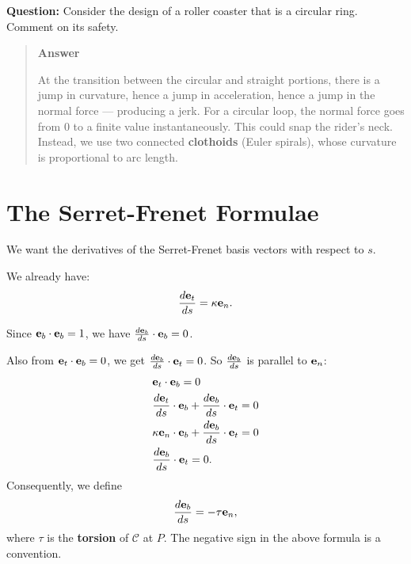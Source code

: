 \documentclass[
  letterpaper,
  DIV=11,
  numbers=noendperiod]{scrreprt}
\begin{document}
\begin{tcolorbox}[enhanced jigsaw, arc=.35mm, bottomrule=.15mm, bottomtitle=1mm, breakable, colback=white, colbacktitle=quarto-callout-tip-color!10!white, colframe=quarto-callout-tip-color-frame, coltitle=black, left=2mm, leftrule=.75mm, opacityback=0, opacitybacktitle=0.6, rightrule=.15mm, title=\textcolor{quarto-callout-tip-color}{\faLightbulb}\hspace{0.5em}{Think!}, titlerule=0mm, toprule=.15mm, toptitle=1mm]

\textbf{Question:} Consider the design of a roller coaster that is a
circular ring. Comment on its safety.

\begin{quote}
\textbf{Answer}

At the transition between the circular and straight portions, there is a
jump in curvature, hence a jump in acceleration, hence a jump in the
normal force --- producing a jerk. For a circular loop, the normal force
goes from 0 to a finite value instantaneously. This could snap the
rider's neck. Instead, we use two connected \textbf{clothoids} (Euler
spirals), whose curvature is proportional to arc length.
\end{quote}

\end{tcolorbox}

\section{The Serret-Frenet Formulae}\label{the-serret-frenet-formulae}

We want the derivatives of the Serret-Frenet basis vectors with respect
to \(s\).

We already have: \begin{align}
    \frac{d{\bf e}_t}{ds} = \kappa{\bf e}_n.
\end{align}

Since \({\bf e}_b\cdot{\bf e}_b = 1\), we have
\(\frac{d{\bf e}_b}{ds}\cdot{\bf e}_b = 0\).

Also from \({\bf e}_t\cdot{\bf e}_b = 0\), we get
\(\frac{d{\bf e}_b}{ds}\cdot{\bf e}_t=0\). So \(\frac{d{\bf e}_b}{ds}\)
is parallel to \({\bf e}_n\): \begin{align}
    & {\bf e}_t\cdot{\bf e}_b = 0\\
    & \frac{d{\bf e}_t}{ds}\cdot{\bf e}_b+\frac{d{\bf e}_b}{ds}\cdot{\bf e}_t = 0\\
    & \kappa{\bf e}_n\cdot{\bf e}_b+\frac{d{\bf e}_b}{ds}\cdot{\bf e}_t = 0\\
    & \frac{d{\bf e}_b}{ds}\cdot{\bf e}_t=0.
\end{align} Consequently, we define \begin{align}
    \frac{d{\bf e}_b}{ds} = -\tau{\bf e}_n,
\end{align} where \(\tau\) is the \textbf{torsion} of \(\mathcal{C}\) at
\(P\). The negative sign in the above formula is a convention.
\end{document}
